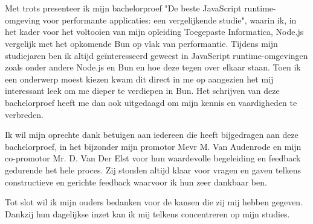 
\chapter*{}%
\label{ch:voorwoord}


Met trots presenteer ik mijn bachelorproef "De beste JavaScript runtime-omgeving voor performante applicaties: een vergelijkende studie", 
waarin ik, in het kader voor het voltooien van mijn opleiding Toegepaste Informatica, Node.js vergelijk met het opkomende Bun op vlak van performantie.
Tijdens mijn studiejaren ben ik altijd geïnteresseerd geweest in JavaScript runtime-omgevingen zoals onder andere Node.js en Bun en
hoe deze tegen over elkaar staan. Toen ik een onderwerp moest kiezen kwam dit direct in me op aangezien het mij interessant leek om me dieper te verdiepen 
in Bun. Het schrijven van deze bachelorproef heeft me dan ook uitgedaagd om mijn kennis en vaardigheden te verbreden.
\vspace{5mm}

Ik wil mijn oprechte dank betuigen aan iedereen die heeft bijgedragen aan deze bachelorproef, 
in het bijzonder mijn promotor Mevr M. Van Audenrode en mijn co-promotor Mr. D. Van Der Elst voor hun
waardevolle begeleiding en feedback gedurende het hele proces. 
Zij stonden altijd klaar voor vragen en gaven telkens constructieve en gerichte feedback waarvoor ik hun zeer dankbaar ben.
\vspace{5mm}

Tot slot wil ik mijn ouders bedanken voor de kansen die zij mij hebben gegeven. 
Dankzij hun dagelijkse inzet kan ik mij telkens concentreren op mijn studies.



